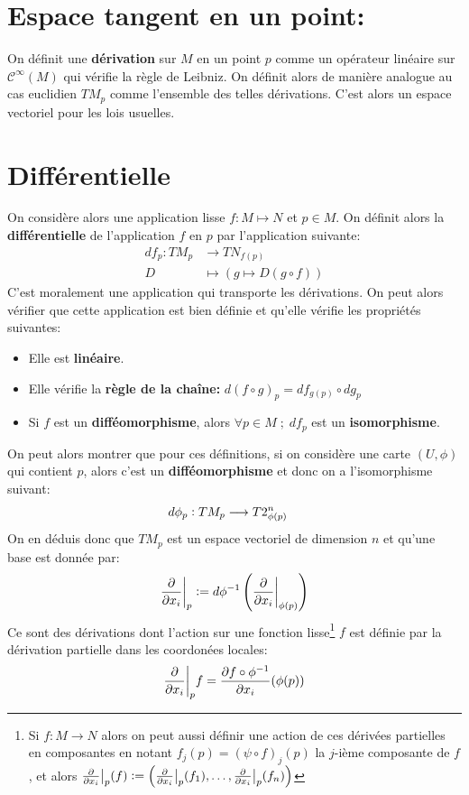    \section{Espace tangent en un point:}
      On définit une \textbf{dérivation} sur \( M \) en un point \( p \) comme un opérateur linéaire sur \( \mathcal{C}^\infty(M) \) qui vérifie la règle de Leibniz. On définit alors de manière analogue au cas euclidien \( TM_p \) comme l'ensemble des telles dérivations. C'est alors un espace vectoriel pour les lois usuelles.
   \section{Différentielle}
      On considère alors une application lisse \( f : M \longmapsto N \) et \( p \in M \). On définit alors la \textbf{différentielle} de l'application \( f \) en \( p \) par l'application suivante:
      \[ 
         \begin{aligned}
            df_p : TM_p &\longrightarrow TN_{f(p)} \\
            D &\longmapsto \left( g \longmapsto D(g \circ f) \right)
         \end{aligned} 
      \]
      C'est moralement une application qui transporte les dérivations. On peut alors vérifier que cette application est bien définie et qu'elle vérifie les propriétés suivantes:
      \begin{itemize}
         \item Elle est \textbf{linéaire}.
         \item Elle vérifie la \textbf{règle de la chaîne:} \( d(f \circ g)_p = df_{g(p)} \circ dg_p \)
         \item Si \( f \) est un \textbf{difféomorphisme}, alors \( \forall p \in M \; ; \; df_p \) est un \textbf{isomorphisme}.
      \end{itemize}
      On peut alors montrer que pour ces définitions, si on considère une carte \( (U, \phi) \) qui contient \( p \), alors c'est un \textbf{difféomorphisme} et donc on a l'isomorphisme suivant:
      \[ 
         \begin{aligned}
            d\phi_p : TM_p &\longrightarrow T2_{\phi(p)}^n
         \end{aligned} 
      \]
      On en déduis donc que \( TM_p \) est un espace vectoriel de dimension \( n \) et qu'une base  est donnée par:
      \[ 
         \frac{\partial }{\partial x_i}\biggr|_p := d\phi^{-1}\left( \frac{\partial }{\partial x_i}\biggr|_{\phi(p)}\right) 
      \]
      Ce sont des dérivations dont l'action sur une fonction lisse\footnote[1]{Si \( f : M \longrightarrow N \) alors on peut aussi définir une action de ces dérivées partielles en composantes en notant \( f_j(p) = (\psi \circ f)_j(p) \) la \( j \)-ième composante de \( f \), et alors \( \frac{\partial }{\partial x_i}\bigr|_p(f) := \left(\frac{\partial }{\partial x_i}\bigr|_p(f_1), \ldots,  \frac{\partial }{\partial x_i}\bigr|_p(f_n)\right) \)} \( f \) est définie par la dérivation partielle dans les coordonées locales:
      \[ 
         \frac{\partial }{\partial x_i}\biggr|_pf = \frac{\partial f \circ \phi^{-1}}{\partial x_i}(\phi(p))
      \]
      \pagebreak
